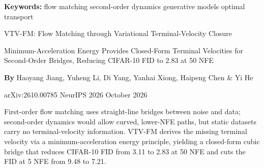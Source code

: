 \documentclass[10pt,twocolumn]{article}
\begin{document}
\setlength{\parindent}{0pt}
\setlength{\parskip}{4pt}

{\small\color{keywordgray}\textbf{Keywords:}
  flow matching \textbullet{}
  second-order dynamics \textbullet{}
  generative models \textbullet{}
  optimal transport}\par\vspace{4pt}

{\LARGE\bfseries\raggedright
  VTV-FM: Flow Matching through Variational Terminal-Velocity
  Closure}\par\vspace{4pt}

{\large\itshape\raggedright
  Minimum-Acceleration Energy Provides Closed-Form Terminal Velocities for
  Second-Order Bridges, Reducing CIFAR-10 FID to 2.83 at 50 NFE}\par\vspace{6pt}

{\small\textbf{By} Haoyang Jiang, Yuheng Li, Di Yang, Yanhai Xiong, Haipeng Chen \& Yi He}\par\vspace{2pt}

{\small\color{keywordgray}arXiv:2610.00785 \textbullet{} NeurIPS 2026 \textbullet{} October 2026}
\par\vspace{2pt}\noindent{\color{rulered}\rule{\columnwidth}{0.6pt}}\vspace{6pt}

First-order flow matching uses straight-line bridges between noise and data;
second-order dynamics would allow curved, lower-NFE paths, but static datasets
carry no terminal-velocity information. VTV-FM derives the missing terminal velocity
via a minimum-acceleration energy principle, yielding a closed-form cubic bridge
that reduces CIFAR-10 FID from 3.11 to 2.83 at 50 NFE and cuts the FID at 5 NFE
from 9.48 to 7.21.
\end{document}
